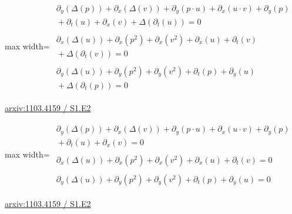 \documentclass[10pt,a4paper]{article}
\begin{document}
\begin{minipage}{\linewidth}
\begin{center}\begin{adjustbox}{max width=\linewidth}$\displaystyle\begin{gathered}\begin{gathered}\partial_{y}(\Delta(p))+\partial_{x}(\Delta(v))+\partial_{y}(p\cdot u)+\partial_{x}(u\cdot v)+\partial_{y}(p)\\[-1pt]{}+\partial_{t}(u)+\partial_{x}(v)+\Delta(\partial_{t}(u))=0\end{gathered}\\[5pt]\begin{gathered}\partial_{x}(\Delta(u))+\partial_{x}(p^{2})+\partial_{x}(v^{2})+\partial_{x}(u)+\partial_{t}(v)\\[-1pt]{}+\Delta(\partial_{t}(v))=0\end{gathered}\\[5pt]\begin{gathered}\partial_{y}(\Delta(u))+\partial_{y}(p^{2})+\partial_{y}(v^{2})+\partial_{t}(p)+\partial_{y}(u)\\[-1pt]{}+\Delta(\partial_{t}(p))=0\end{gathered}\end{gathered}$\end{adjustbox}\end{center}
{\small \href{https://arxiv.org/html/1103.4159#S1.E2}{arxiv:1103.4159 / S1.E2}}\par
\end{minipage}\par\vspace{7mm}

\begin{minipage}{\linewidth}
\begin{center}\begin{adjustbox}{max width=\linewidth}$\displaystyle\begin{gathered}\begin{gathered}\partial_{y}(\Delta(p))+\partial_{x}(\Delta(v))+\partial_{y}(p\cdot u)+\partial_{x}(u\cdot v)+\partial_{y}(p)\\[-1pt]{}+\partial_{t}(u)+\partial_{x}(v)=0\end{gathered}\\[5pt]\begin{gathered}\partial_{x}(\Delta(u))+\partial_{x}(p^{2})+\partial_{x}(v^{2})+\partial_{x}(u)+\partial_{t}(v)=0\end{gathered}\\[5pt]\begin{gathered}\partial_{y}(\Delta(u))+\partial_{y}(p^{2})+\partial_{y}(v^{2})+\partial_{t}(p)+\partial_{y}(u)=0\end{gathered}\end{gathered}$\end{adjustbox}\end{center}
{\small \href{https://arxiv.org/html/1103.4159#S1.E2}{arxiv:1103.4159 / S1.E2}}\par
\end{minipage}\par\vspace{7mm}
\end{document}
